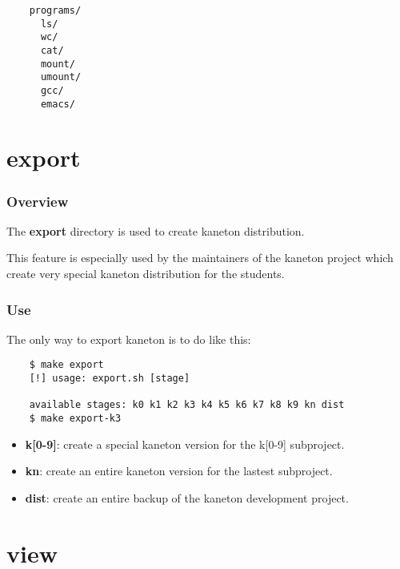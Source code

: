 {\begin{frame}[containsverbatim]
  \begin{verbatim}
    programs/
      ls/
      wc/
      cat/
      mount/
      umount/
      gcc/
      emacs/
  \end{verbatim}
\end{frame}

%
%

\section{export}


\begin{frame}
  \frametitle{Overview}

  The \textbf{export} directory is used to create kaneton distribution.

  \nl

  This feature is especially used by the maintainers of the kaneton
  project which create very special kaneton distribution for
  the students.
\end{frame}


\begin{frame}[containsverbatim]
  \frametitle{Use}

  The only way to export kaneton is to do like this:

  \begin{verbatim}
    $ make export
    [!] usage: export.sh [stage]

    available stages: k0 k1 k2 k3 k4 k5 k6 k7 k8 k9 kn dist
    $ make export-k3
  \end{verbatim}

  \begin{itemize}
    \item
      \textbf{k[0-9]}: create a special kaneton version for the k[0-9]
      subproject.
    \item
      \textbf{kn}: create an entire kaneton version for the lastest
      subproject.
    \item
      \textbf{dist}: create an entire backup of the kaneton development
      project.
  \end{itemize}
\end{frame}

%
%

\section{view}

}
